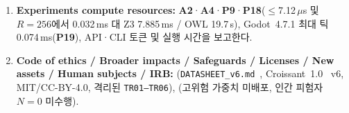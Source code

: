 \documentclass{article}
\begin{document}
\begin{enumerate}
\item {\bf Experiments compute resources:} \answerYes{} \textbf{A2}·\textbf{A4}·\textbf{P9}·\textbf{P18}($\le$7.12\,$\mu$s 및 $R{=}256$에서 0.032\,ms 대 Z3 7.885\,ms / OWL 19.7\,s), Godot~4.7.1 최대 틱 0.074\,ms(\textbf{P19}), API·CLI 토큰 및 실행 시간을 보고한다.
\item {\bf Code of ethics / Broader impacts / Safeguards / Licenses / New assets / Human subjects / IRB:} \answerYes{} (\texttt{DATASHEET\_v6.md}~\cite{gebru2021datasheets}, Croissant~1.0~\cite{akhtar2024croissant} v6, MIT/CC-BY-4.0, 격리된 \texttt{TR01--TR06}), \answerNA{} (고위험 가중치 미배포, 인간 피험자 $N{=}0$ 미수행).
\end{enumerate}
\end{document}
